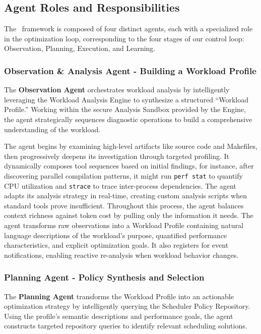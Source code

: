 \subsection{Agent Roles and Responsibilities}
The \agent\ framework is composed of four distinct agents, each with a specialized role in the optimization loop, corresponding to the four stages of our control loop: Observation, Planning, Execution, and Learning.

\subsubsection{Observation \& Analysis Agent - Building a Workload Profile}

The \textbf{Observation Agent} orchestrates workload analysis by intelligently leveraging the Workload Analysis Engine to synthesize a structured ``Workload Profile.'' Working within the secure Analysis Sandbox provided by the Engine, the agent strategically sequences diagnostic operations to build a comprehensive understanding of the workload.

The agent begins by examining high-level artifacts like source code and Makefiles, then progressively deepens its investigation through targeted profiling. It dynamically composes tool sequences based on initial findings, for instance, after discovering parallel compilation patterns, it might run \texttt{perf stat} to quantify CPU utilization and \texttt{strace} to trace inter-process dependencies. The agent adapts its analysis strategy in real-time, creating custom analysis scripts when standard tools prove insufficient. Throughout this process, the agent balances context richness against token cost by pulling only the information it needs. The agent transforms raw observations into a Workload Profile containing natural language descriptions of the workload's purpose, quantified performance characteristics, and explicit optimization goals. It also registers for event notifications, enabling reactive re-analysis when workload behavior changes.

\subsubsection{Planning Agent - Policy Synthesis and Selection}

The \textbf{Planning Agent} transforms the Workload Profile into an actionable optimization strategy by intelligently querying the Scheduler Policy Repository. Using the profile's semantic descriptions and performance goals, the agent constructs targeted repository queries to identify relevant scheduling solutions.

